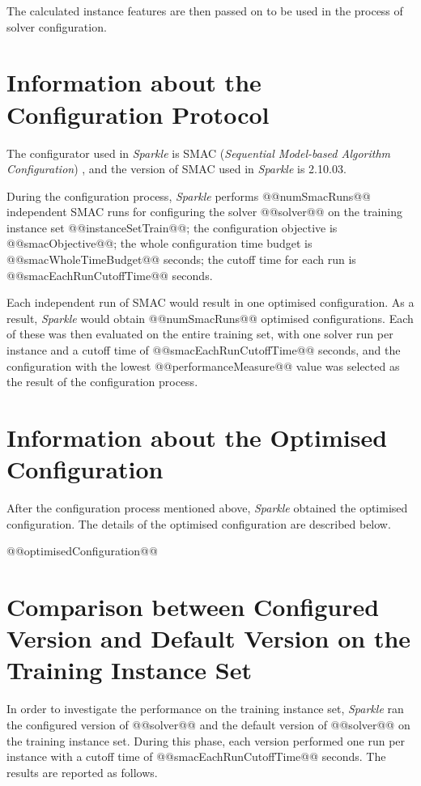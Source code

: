 \documentclass[british]{article}
\newif\iffeatures
\begin{document}
        The calculated instance features are then passed on to be used in the process of solver configuration. 

\fi


\section{Information about the Configuration Protocol}

The configurator used in \emph{Sparkle} is SMAC ({\em Sequential Model-based Algorithm Configuration}) \cite{HutEtAl11}, and the version of SMAC used in \emph{Sparkle} is 2.10.03.

During the configuration process, \emph{Sparkle} performs @@numSmacRuns@@ independent SMAC runs for configuring the solver @@solver@@ on the training instance set @@instanceSetTrain@@\iffeatures; the instance features of the training instance set were used for configuration\fi; the configuration objective is @@smacObjective@@; the whole configuration time budget is @@smacWholeTimeBudget@@ seconds; the cutoff time for each run is @@smacEachRunCutoffTime@@ seconds.

Each independent run of SMAC would result in one optimised configuration. As a result, \emph{Sparkle} would obtain @@numSmacRuns@@ optimised configurations. Each of these was then evaluated on the entire training set, with one solver run per instance and a cutoff time of @@smacEachRunCutoffTime@@ seconds, and the configuration with the lowest @@performanceMeasure@@ value was selected as the result of the configuration process.

\section{Information about the Optimised Configuration}

After the configuration process mentioned above, \emph{Sparkle} obtained the optimised configuration. The details of the optimised configuration are described below.

\vspace{5mm}

@@optimisedConfiguration@@

\vspace{5mm}


\section{Comparison between Configured Version and Default Version on the Training Instance Set}
In order to investigate the performance on the training instance set, \emph{Sparkle} ran the configured version of @@solver@@ and the default version of @@solver@@ on the training instance set. During this phase, each version performed one run per instance with a cutoff time of @@smacEachRunCutoffTime@@ seconds. The results are reported as follows.
\end{document}
